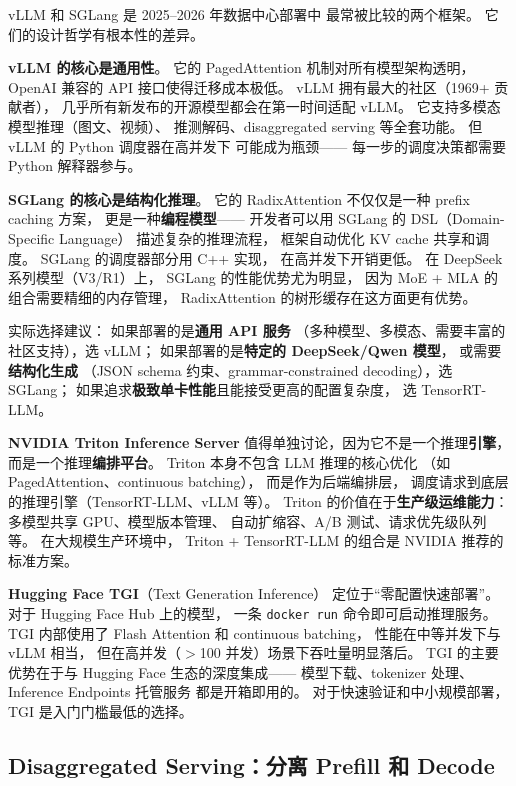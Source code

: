 \begin{whybox}
vLLM 和 SGLang 是 2025--2026 年数据中心部署中
最常被比较的两个框架。
它们的设计哲学有根本性的差异。

\textbf{vLLM 的核心是通用性}。
它的 PagedAttention 机制对所有模型架构透明，
OpenAI 兼容的 API 接口使得迁移成本极低。
vLLM 拥有最大的社区（1969+ 贡献者），
几乎所有新发布的开源模型都会在第一时间适配 vLLM。
它支持多模态模型推理（图文、视频）、
推测解码、disaggregated serving 等全套功能。
但 vLLM 的 Python 调度器在高并发下
可能成为瓶颈——
每一步的调度决策都需要 Python 解释器参与。

\textbf{SGLang 的核心是结构化推理}。
它的 RadixAttention 不仅仅是一种 prefix caching 方案，
更是一种\textbf{编程模型}——
开发者可以用 SGLang 的 DSL（Domain-Specific Language）
描述复杂的推理流程，
框架自动优化 KV cache 共享和调度。
SGLang 的调度器部分用 C++ 实现，
在高并发下开销更低。
在 DeepSeek 系列模型（V3/R1）上，
SGLang 的性能优势尤为明显，
因为 MoE + MLA 的组合需要精细的内存管理，
RadixAttention 的树形缓存在这方面更有优势。

实际选择建议：
如果部署的是\textbf{通用 API 服务}
（多种模型、多模态、需要丰富的社区支持），选 vLLM；
如果部署的是\textbf{特定的 DeepSeek/Qwen 模型}，
或需要\textbf{结构化生成}
（JSON schema 约束、grammar-constrained decoding），选 SGLang；
如果追求\textbf{极致单卡性能}且能接受更高的配置复杂度，
选 TensorRT-LLM。
\end{whybox}

\textbf{NVIDIA Triton Inference Server}
值得单独讨论，因为它不是一个推理\textbf{引擎}，
而是一个推理\textbf{编排平台}。
Triton 本身不包含 LLM 推理的核心优化
（如 PagedAttention、continuous batching），
而是作为后端编排层，
调度请求到底层的推理引擎（TensorRT-LLM、vLLM 等）。
Triton 的价值在于\textbf{生产级运维能力}：
多模型共享 GPU、模型版本管理、
自动扩缩容、A/B 测试、请求优先级队列等。
在大规模生产环境中，
Triton + TensorRT-LLM 的组合是 NVIDIA 推荐的标准方案。

\textbf{Hugging Face TGI}（Text Generation Inference）
定位于``零配置快速部署''。
对于 Hugging Face Hub 上的模型，
一条 \texttt{docker run} 命令即可启动推理服务。
TGI 内部使用了 Flash Attention 和 continuous batching，
性能在中等并发下与 vLLM 相当，
但在高并发（$>$100 并发）场景下吞吐量明显落后。
TGI 的主要优势在于与 Hugging Face 生态的深度集成——
模型下载、tokenizer 处理、Inference Endpoints 托管服务
都是开箱即用的。
对于快速验证和中小规模部署，TGI 是入门门槛最低的选择。

\subsection{Disaggregated Serving：分离 Prefill 和 Decode}

